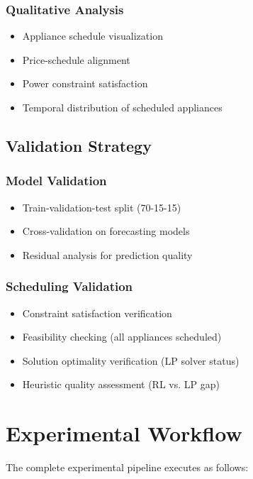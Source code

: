 \documentclass[conference]{IEEEtran}
\begin{document}
\subsubsection{Qualitative Analysis}
\begin{itemize}
    \item Appliance schedule visualization
    \item Price-schedule alignment
    \item Power constraint satisfaction
    \item Temporal distribution of scheduled appliances
\end{itemize}

\subsection{Validation Strategy}

\subsubsection{Model Validation}
\begin{itemize}
    \item Train-validation-test split (70-15-15)
    \item Cross-validation on forecasting models
    \item Residual analysis for prediction quality
\end{itemize}

\subsubsection{Scheduling Validation}
\begin{itemize}
    \item Constraint satisfaction verification
    \item Feasibility checking (all appliances scheduled)
    \item Solution optimality verification (LP solver status)
    \item Heuristic quality assessment (RL vs. LP gap)
\end{itemize}

\section{Experimental Workflow}

The complete experimental pipeline executes as follows:
\end{document}
